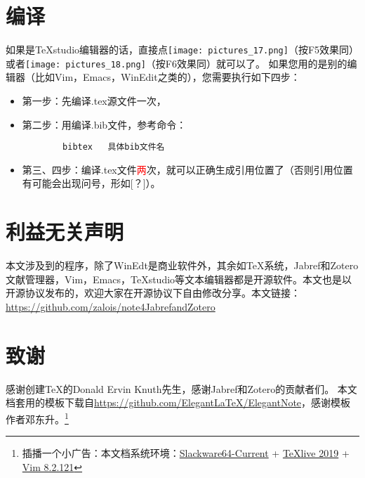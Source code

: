 \documentclass[cn,geye,cyan,normal,14pt]{elegantnote}
\begin{document}
\section{编译}
如果是\TeX studio编辑器的话，直接点\texttt{[image: pictures\_17.png]}（按F5效果同）或者\texttt{[image: pictures\_18.png]}（按F6效果同）就可以了。
如果您用的是别的编辑器（比如Vim，Emacs，WinEdit之类的），您需要执行如下四步\cite[第 380 页]{胡伟2013LATEX}：
\begin{itemize}
	\item 第一步：先编译.tex源文件一次，
	\item 第二步：用\BibTeX 编译.bib文件，参考命令：
		\begin{lstlisting}
		bibtex   具体bib文件名
		\end{lstlisting}
	\item 第三、四步：编译.tex文件\textcolor{red}{两}次，就可以正确生成引用位置了（否则引用位置有可能会出现问号，形如[？]）。
\end{itemize}
\section{利益无关声明}
本文涉及到的程序，除了WinEdt是商业软件外，其余如\TeX 系统，Jabref和Zotero文献管理器，Vim，Emacs，\TeX studio等文本编辑器都是开源软件。本文也是以开源协议发布的，欢迎大家在开源协议下自由修改分享。本文链接：\url{https://github.com/zalois/note4JabrefandZotero}
\section{致谢}
感谢创建\TeX 的Donald Ervin Knuth先生，感谢Jabref和Zotero的贡献者们。
本文档套用的模板下载自\href{https://github.com/ElegantLaTeX/ElegantNote}{https://github.com/Elegant\LaTeX/ElegantNote}，感谢模板作者邓东升。\footnote{插播一个小广告：本文档系统环境：\href{https://mirrors.slackware.com/slackware/slackware64-current/}{Slackware64-Current} + \href{https://www.tug.org/texlive/}{\TeX live 2019} + \href{https://www.vim.org/}{Vim 8.2.121}}
%

\end{document}
